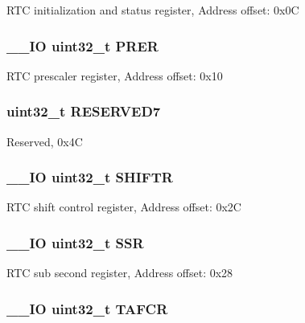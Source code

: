 R\-T\-C initialization and status register, Address offset\-: 0x0\-C \hypertarget{struct_r_t_c___type_def_ac9b4c6c5b29f3461ce3f875eea69f35b}{
\subsubsection[{P\-R\-E\-R}]{\setlength{\rightskip}{0pt plus 5cm}\-\_\-\-\_\-\-I\-O uint32\-\_\-t P\-R\-E\-R}}\label{struct_r_t_c___type_def_ac9b4c6c5b29f3461ce3f875eea69f35b}
R\-T\-C prescaler register, Address offset\-: 0x10 \hypertarget{struct_r_t_c___type_def_a6be3d40baea405ecaf6b38462357dac0}{
\subsubsection[{R\-E\-S\-E\-R\-V\-E\-D7}]{\setlength{\rightskip}{0pt plus 5cm}uint32\-\_\-t R\-E\-S\-E\-R\-V\-E\-D7}}\label{struct_r_t_c___type_def_a6be3d40baea405ecaf6b38462357dac0}
Reserved, 0x4\-C \hypertarget{struct_r_t_c___type_def_a2372c05a6c5508e0a9adada793f68b4f}{
\subsubsection[{S\-H\-I\-F\-T\-R}]{\setlength{\rightskip}{0pt plus 5cm}\-\_\-\-\_\-\-I\-O uint32\-\_\-t S\-H\-I\-F\-T\-R}}\label{struct_r_t_c___type_def_a2372c05a6c5508e0a9adada793f68b4f}
R\-T\-C shift control register, Address offset\-: 0x2\-C \hypertarget{struct_r_t_c___type_def_a8a868e5e76b52ced04c536be3dee08ec}{
\subsubsection[{S\-S\-R}]{\setlength{\rightskip}{0pt plus 5cm}\-\_\-\-\_\-\-I\-O uint32\-\_\-t S\-S\-R}}\label{struct_r_t_c___type_def_a8a868e5e76b52ced04c536be3dee08ec}
R\-T\-C sub second register, Address offset\-: 0x28 \hypertarget{struct_r_t_c___type_def_a14d03244a7fda1d94b51ae9ed144ca12}{
\subsubsection[{T\-A\-F\-C\-R}]{\setlength{\rightskip}{0pt plus 5cm}\-\_\-\-\_\-\-I\-O uint32\-\_\-t T\-A\-F\-C\-R}}\label{struct_r_t_c___type_def_a14d03244a7fda1d94b51ae9ed144ca12}
